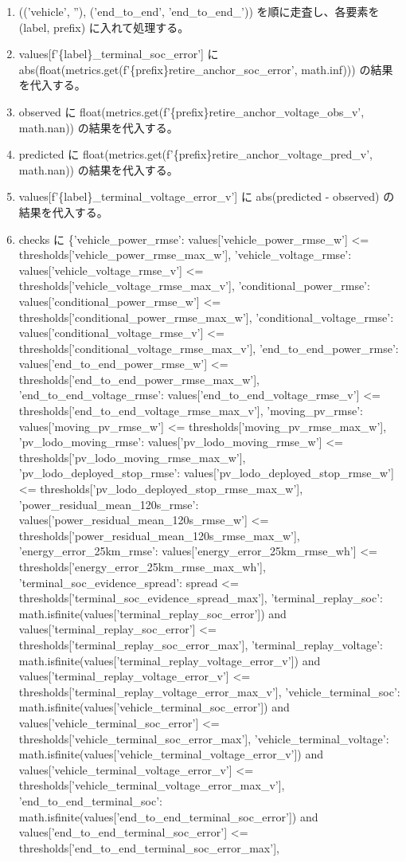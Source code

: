 \documentclass[a4paper,11pt]{article}
\begin{document}
\begin{enumerate}[leftmargin=1.8em]
\item (('vehicle', ''), ('end\_to\_end', 'end\_to\_end\_')) を順に走査し、各要素を (label, prefix) に入れて処理する。
\item   values[f'\{label\}\_terminal\_soc\_error'] に abs(float(metrics.get(f'\{prefix\}retire\_anchor\_soc\_error', math.inf))) の結果を代入する。
\item   observed に float(metrics.get(f'\{prefix\}retire\_anchor\_voltage\_obs\_v', math.nan)) の結果を代入する。
\item   predicted に float(metrics.get(f'\{prefix\}retire\_anchor\_voltage\_pred\_v', math.nan)) の結果を代入する。
\item   values[f'\{label\}\_terminal\_voltage\_error\_v'] に abs(predicted - observed) の結果を代入する。
\item checks に \{'vehicle\_power\_rmse': values['vehicle\_power\_rmse\_w'] <= thresholds['vehicle\_power\_rmse\_max\_w'], 'vehicle\_voltage\_rmse': values['vehicle\_voltage\_rmse\_v'] <= thresholds['vehicle\_voltage\_rmse\_max\_v'], 'conditional\_power\_rmse': values['conditional\_power\_rmse\_w'] <= thresholds['conditional\_power\_rmse\_max\_w'], 'conditional\_voltage\_rmse': values['conditional\_voltage\_rmse\_v'] <= thresholds['conditional\_voltage\_rmse\_max\_v'], 'end\_to\_end\_power\_rmse': values['end\_to\_end\_power\_rmse\_w'] <= thresholds['end\_to\_end\_power\_rmse\_max\_w'], 'end\_to\_end\_voltage\_rmse': values['end\_to\_end\_voltage\_rmse\_v'] <= thresholds['end\_to\_end\_voltage\_rmse\_max\_v'], 'moving\_pv\_rmse': values['moving\_pv\_rmse\_w'] <= thresholds['moving\_pv\_rmse\_max\_w'], 'pv\_lodo\_moving\_rmse': values['pv\_lodo\_moving\_rmse\_w'] <= thresholds['pv\_lodo\_moving\_rmse\_max\_w'], 'pv\_lodo\_deployed\_stop\_rmse': values['pv\_lodo\_deployed\_stop\_rmse\_w'] <= thresholds['pv\_lodo\_deployed\_stop\_rmse\_max\_w'], 'power\_residual\_mean\_120s\_rmse': values['power\_residual\_mean\_120s\_rmse\_w'] <= thresholds['power\_residual\_mean\_120s\_rmse\_max\_w'], 'energy\_error\_25km\_rmse': values['energy\_error\_25km\_rmse\_wh'] <= thresholds['energy\_error\_25km\_rmse\_max\_wh'], 'terminal\_soc\_evidence\_spread': spread <= thresholds['terminal\_soc\_evidence\_spread\_max'], 'terminal\_replay\_soc': math.isfinite(values['terminal\_replay\_soc\_error']) and values['terminal\_replay\_soc\_error'] <= thresholds['terminal\_replay\_soc\_error\_max'], 'terminal\_replay\_voltage': math.isfinite(values['terminal\_replay\_voltage\_error\_v']) and values['terminal\_replay\_voltage\_error\_v'] <= thresholds['terminal\_replay\_voltage\_error\_max\_v'], 'vehicle\_terminal\_soc': math.isfinite(values['vehicle\_terminal\_soc\_error']) and values['vehicle\_terminal\_soc\_error'] <= thresholds['vehicle\_terminal\_soc\_error\_max'], 'vehicle\_terminal\_voltage': math.isfinite(values['vehicle\_terminal\_voltage\_error\_v']) and values['vehicle\_terminal\_voltage\_error\_v'] <= thresholds['vehicle\_terminal\_voltage\_error\_max\_v'], 'end\_to\_end\_terminal\_soc': math.isfinite(values['end\_to\_end\_terminal\_soc\_error']) and values['end\_to\_end\_terminal\_soc\_error'] <= thresholds['end\_to\_end\_terminal\_soc\_error\_max'], 
\end{enumerate}
\end{document}
